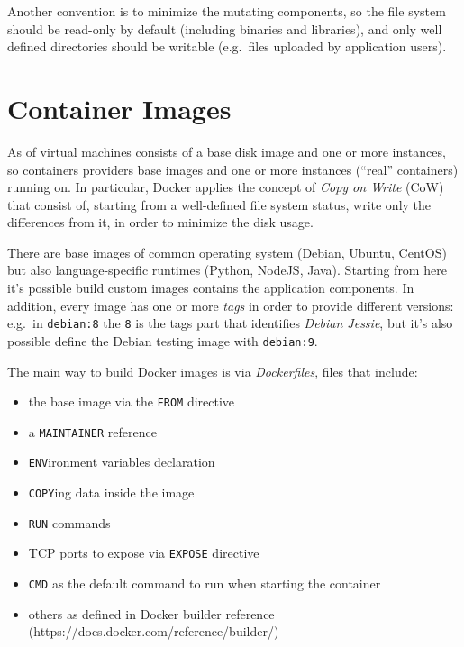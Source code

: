 Another convention is to minimize the mutating components, so the file
system should be read-only by default (including binaries and
libraries), and only well defined directories should be writable
(e.g.~files uploaded by application users).

\section{Container Images}\label{container-images}

As of virtual machines consists of a base disk image and one or more
instances, so containers providers base images and one or more instances
(``real'' containers) running on. In particular, Docker applies the
concept of \textit{Copy on Write} (CoW) that consist of, starting from a
well-defined file system status, write only the differences from it, in
order to minimize the disk usage.

There are base images of common operating system (Debian, Ubuntu,
CentOS) but also language-specific runtimes (Python, NodeJS, Java).
Starting from here it's possible build custom images contains the
application components. In addition, every image has one or more
\textit{tags} in order to provide different versions: e.g.~in
\texttt{debian:8} the \texttt{8} is the tags part that identifies
\textit{Debian Jessie}, but it's also possible define the Debian testing
image with \texttt{debian:9}.

The main way to build Docker images is via \textit{Dockerfiles}, files
that include:

\begin{itemize}

\item
  the base image via the \texttt{FROM} directive
\item
  a \texttt{MAINTAINER} reference
\item
  \texttt{ENV}ironment variables declaration
\item
  \texttt{COPY}ing data inside the image
\item
  \texttt{RUN} commands
\item
  TCP ports to expose via \texttt{EXPOSE} directive
\item
  \texttt{CMD} as the default command to run when starting the container
\item
  others as defined in Docker builder reference
  (https://docs.docker.com/reference/builder/)
\end{itemize}


